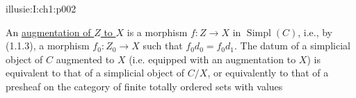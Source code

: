 \begin{illusiebodypage}{illusie:I:ch1:p002}
\hypertarget{illusie:I:ch1:s1:1:eq3}{}%
\noindent{}\par

\hypertarget{illusie:I:ch1:s1:1:p5}{}%
An \underline{augmentation of $Z$ to $X$} is a morphism
$f:Z\longrightarrow X$ in $\operatorname{Simpl}(C)$, i.e., by (1.1.3), a
morphism $f_0:Z_0\longrightarrow X$ such that $f_0d_0=f_0d_1$. The datum of a
simplicial object of $C$ augmented to $X$ (i.e. equipped with an augmentation
to $X$) is equivalent to that of a simplicial object of $C/X$, or equivalently
to that of a presheaf on the category of finite totally ordered sets with values
\end{illusiebodypage}
